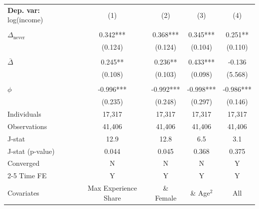 \begin{tabular}{l cccc} \toprule  \textbf{Dep. var:}  log(income) 
                    &\multicolumn{1}{c}{(1)}   &\multicolumn{1}{c}{(2)}   &\multicolumn{1}{c}{(3)}   &\multicolumn{1}{c}{(4)}   \\
                    &               &               &               &               \\
\addlinespace
$\Delta_{\text{never}}$&       0.342***&       0.368***&       0.345***&       0.251** \\
                    &     (0.124)   &     (0.124)   &     (0.104)   &     (0.110)   \\
                    &               &               &               &               \\
\addlinespace
$\bar{\Delta}$      &       0.245** &       0.236** &       0.433***&      -0.136   \\
                    &     (0.108)   &     (0.103)   &     (0.098)   &     (5.568)   \\
                    &               &               &               &               \\
\addlinespace
$\phi$              &      -0.996***&      -0.992***&      -0.998***&      -0.986***\\
                    &     (0.235)   &     (0.248)   &     (0.297)   &     (0.146)   \\
\addlinespace
Individuals         &      17,317   &      17,317   &      17,317   &      17,317   \\
Observations        &      41,406   &      41,406   &      41,406   &      41,406   \\
J-stat              &        12.9   &        12.8   &         6.5   &         3.1   \\
J-stat (p-value)    &       0.044   &       0.045   &       0.368   &       0.375   \\
Converged           &           N   &           N   &           N   &           Y   \\
\cmidrule{2-5} Time FE & Y & Y & Y & Y \\ Covariates & Max Experience Share & \& Female & \& Age$^2$ & All \\ \bottomrule \end{tabular}
